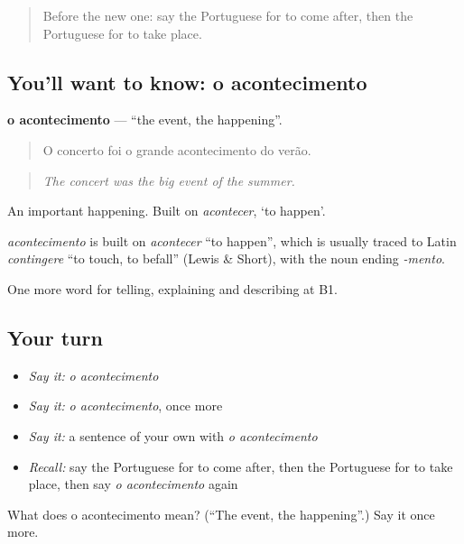 \begin{quote}
Before the new one: say the Portuguese for to come after, then the Portuguese for to take place.
\end{quote}

\subsection*{You'll want to know: o acontecimento}
\textbf{o acontecimento} — \textquotedblleft{}the event, the happening\textquotedblright{}.

\begin{quote}
O concerto foi o grande acontecimento do verão.
\end{quote}

\begin{quote}
\emph{The concert was the big event of the summer.}
\end{quote}

An important happening. Built on \emph{acontecer}, ‘to happen’.

\begin{cousinweb}
\emph{acontecimento} is built on \emph{acontecer} \textquotedblleft{}to happen\textquotedblright{}, which is usually traced to Latin \emph{contingere} \textquotedblleft{}to touch, to befall\textquotedblright{} (Lewis \& Short), with the noun ending \emph{-mento}.
\end{cousinweb}

\begin{grammarlens}[title={What you've built}]
One more word for telling, explaining and describing at B1.
\end{grammarlens}

\subsection*{Your turn}
\begin{itemize}
\raggedright
  \item \emph{Say it:} \emph{o acontecimento}
  \item \emph{Say it:} \emph{o acontecimento}, once more
  \item \emph{Say it:} a sentence of your own with \emph{o acontecimento}
  \item \emph{Recall:} say the Portuguese for to come after, then the Portuguese for to take place, then say \emph{o acontecimento} again
\end{itemize}

\begin{tcolorbox}[breakable,colback=teal!4,colframe=teal!35!black,title={Before you move on}]
What does o acontecimento mean? (\textquotedblleft{}The event, the happening\textquotedblright{}.) Say it once more.
\end{tcolorbox}

